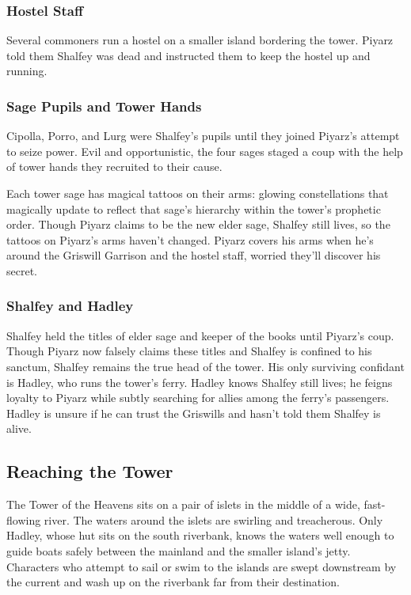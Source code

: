 \documentclass[10pt,a4paper,twoside,bg=print,twocolumn,openany,nodeprecatedcode]{dndbook}
\begin{document}
\subsubsection{Hostel Staff}
Several commoners run a hostel on a smaller island bordering the tower. Piyarz told them Shalfey was dead and instructed them to keep the hostel up and running.

\subsubsection{Sage Pupils and Tower Hands}
Cipolla, Porro, and Lurg were Shalfey's pupils until they joined Piyarz's attempt to seize power. Evil and opportunistic, the four sages staged a coup with the help of tower hands they recruited to their cause.

Each tower sage has magical tattoos on their arms: glowing constellations that magically update to reflect that sage's hierarchy within the tower's prophetic order. Though Piyarz claims to be the new elder sage, Shalfey still lives, so the tattoos on Piyarz's arms haven't changed. Piyarz covers his arms when he's around the Griswill Garrison and the hostel staff, worried they'll discover his secret.

\subsubsection{Shalfey and Hadley}
Shalfey held the titles of elder sage and keeper of the books until Piyarz's coup. Though Piyarz now falsely claims these titles and Shalfey is confined to his sanctum, Shalfey remains the true head of the tower. His only surviving confidant is Hadley, who runs the tower's ferry. Hadley knows Shalfey still lives; he feigns loyalty to Piyarz while subtly searching for allies among the ferry's passengers. Hadley is unsure if he can trust the Griswills and hasn't told them Shalfey is alive.

\subsection{Reaching the Tower}
The Tower of the Heavens sits on a pair of islets in the middle of a wide, fast-flowing river. The waters around the islets are swirling and treacherous. Only Hadley, whose hut sits on the south riverbank, knows the waters well enough to guide boats safely between the mainland and the smaller island's jetty. Characters who attempt to sail or swim to the islands are swept downstream by the current and wash up on the riverbank far from their destination.
\end{document}
